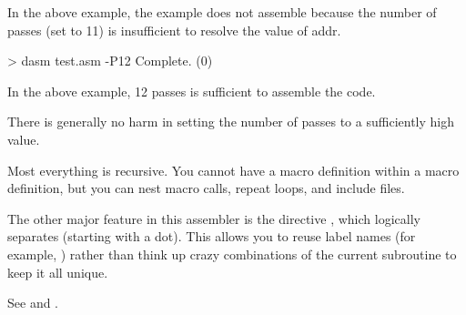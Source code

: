 In the above example, the example does not assemble because the number of passes (set to 11) is insufficient to resolve the value of addr.  
    
 \begin{outputx}
 > dasm test.asm -P12
 Complete. (0)
\end{outputx} 
 
 In the above example, 12 passes is sufficient to assemble the code.
 
 There is generally no harm in setting the number of passes to a sufficiently high value.
 
 
 Most everything is recursive.  You cannot have a macro definition
 within a macro definition, but you can nest macro calls, repeat loops,
 and include files.
 
 The other major feature in this assembler is the  directive , which logically separates  (starting with a dot).  This
 allows you to reuse label names (for example, ) rather than
 think up crazy combinations of the current subroutine to keep it all
 unique.
 
 See  and .
 
 